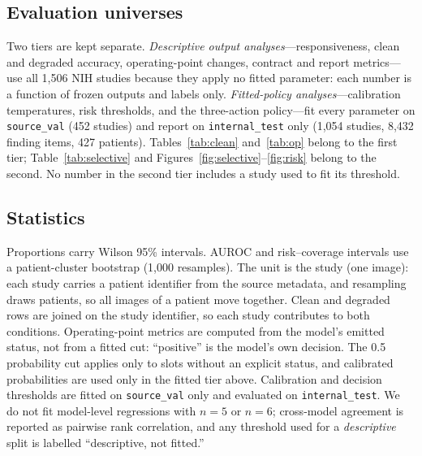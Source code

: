 \subsection{Evaluation universes}

Two tiers are kept separate. \emph{Descriptive output analyses}---responsiveness, clean and degraded accuracy, operating-point changes, contract and report metrics---use all 1,506 NIH studies because they apply no fitted parameter: each number is a function of frozen outputs and labels only. \emph{Fitted-policy analyses}---calibration temperatures, risk thresholds, and the three-action policy---fit every parameter on \texttt{source\_val} (452 studies) and report on \texttt{internal\_test} only (1,054 studies, 8,432 finding items, 427 patients). Tables~\ref{tab:clean} and~\ref{tab:op} belong to the first tier; Table~\ref{tab:selective} and Figures~\ref{fig:selective}--\ref{fig:risk} belong to the second. No number in the second tier includes a study used to fit its threshold.

\subsection{Statistics}

Proportions carry Wilson 95\% intervals. AUROC and risk--coverage intervals use a patient-cluster bootstrap (1,000 resamples). The unit is the study (one image): each study carries a patient identifier from the source metadata, and resampling draws patients, so all images of a patient move together. Clean and degraded rows are joined on the study identifier, so each study contributes to both conditions. Operating-point metrics are computed from the model's emitted status, not from a fitted cut: ``positive'' is the model's own decision. The 0.5 probability cut applies only to slots without an explicit status, and calibrated probabilities are used only in the fitted tier above. Calibration and decision thresholds are fitted on \texttt{source\_val} only and evaluated on \texttt{internal\_test}. We do not fit model-level regressions with $n=5$ or $n=6$; cross-model agreement is reported as pairwise rank correlation, and any threshold used for a \emph{descriptive} split is labelled ``descriptive, not fitted.''
